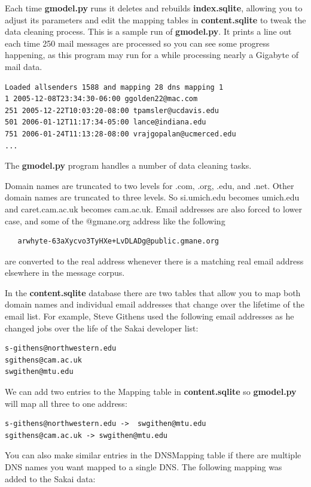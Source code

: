 Each time {\bf gmodel.py} runs it deletes and rebuilds {\bf index.sqlite}, allowing
you to adjust its parameters and edit the mapping tables in {\bf content.sqlite} to tweak the 
data cleaning process. This is a sample run of {\bf gmodel.py}.  It prints a line out each time
250 mail messages are processed so you can see some progress happening, as this program may
run for a while processing nearly a Gigabyte of mail data.

\beforeverb
\begin{verbatim}
Loaded allsenders 1588 and mapping 28 dns mapping 1
1 2005-12-08T23:34:30-06:00 ggolden22@mac.com
251 2005-12-22T10:03:20-08:00 tpamsler@ucdavis.edu
501 2006-01-12T11:17:34-05:00 lance@indiana.edu
751 2006-01-24T11:13:28-08:00 vrajgopalan@ucmerced.edu
...
\end{verbatim}
\afterverb
%

The {\bf gmodel.py} program handles a number of data cleaning tasks.

Domain names are truncated to two levels for .com, .org, .edu, and .net.
Other domain names are truncated to three levels.  So si.umich.edu becomes
umich.edu and caret.cam.ac.uk becomes cam.ac.uk.   Email addresses are also
forced to lower case, and some of the @gmane.org address like the following

\beforeverb
\begin{verbatim}
   arwhyte-63aXycvo3TyHXe+LvDLADg@public.gmane.org
\end{verbatim}
\afterverb
%
are converted to the real address whenever there is a matching real email
address elsewhere in the message corpus.

In the {\bf content.sqlite} database there are two tables that allow
you to map both domain names and individual email addresses that change over 
the lifetime of the email list.  For example, Steve Githens used the following
email addresses as he changed jobs over the life of the Sakai developer list:

\beforeverb
\begin{verbatim}
s-githens@northwestern.edu
sgithens@cam.ac.uk
swgithen@mtu.edu
\end{verbatim}
\afterverb
%
We can add two entries to the Mapping table in {\bf content.sqlite} so 
{\bf gmodel.py} will map all three to one address:

\beforeverb
\begin{verbatim}
s-githens@northwestern.edu ->  swgithen@mtu.edu
sgithens@cam.ac.uk -> swgithen@mtu.edu
\end{verbatim}
\afterverb
%
You can also make similar entries in the DNSMapping table if there are multiple
DNS names you want mapped to a single DNS.  The following mapping was added to the Sakai data:

